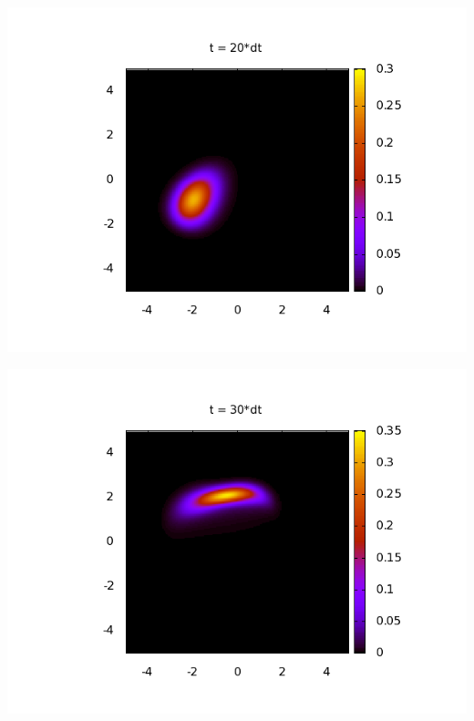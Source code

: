 \begin{center}
\begin{minipage}[t]{.49\textwidth}
 \includegraphics[width=1\linewidth]{pictures/Poincare_20dt.png}
\end{minipage}
\begin{minipage}[t]{.49\textwidth}
 \includegraphics[width=1\linewidth]{pictures/Poincare_30dt.png}
\end{minipage}


\end{center}
